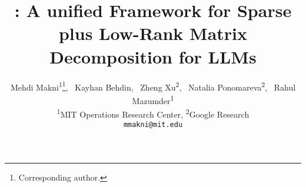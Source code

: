 
\title{
\ourframework: A unified Framework for Sparse plus Low-Rank Matrix Decomposition for LLMs
}


\author{%
  Mehdi Makni\textsuperscript{1}\thanks{Corresponding author.}, ~Kayhan Behdin, ~Zheng Xu\textsuperscript{2}, ~Natalia Ponomareva\textsuperscript{2},
  ~Rahul Mazumder\textsuperscript{1}\\
  \textsuperscript{1}MIT Operations Research Center,
  \textsuperscript{2}Google Research\\
  \texttt{mmakni@mit.edu}
}

